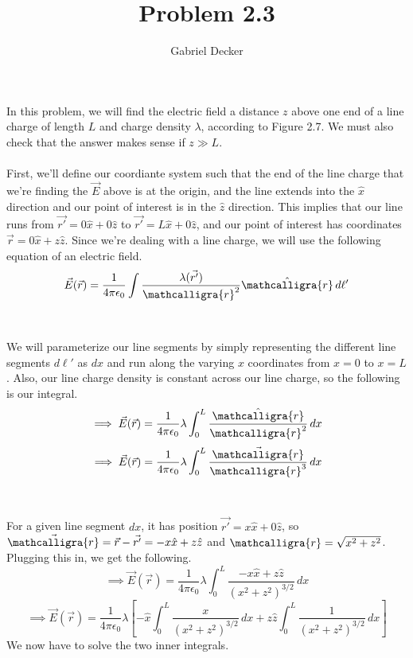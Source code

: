 \documentclass[12pt]{article}
\title{Problem 2.3}
\author{Gabriel Decker}
\newcommand{\scripty}[1]{\ensuremath{\mathcalligra{#1}}}
\begin{document}
\maketitle
\begin{flushleft}

In this problem, we will find the electric field a distance $z$ above one end of a line charge of length $L$ and charge density $\lambda$, according to Figure 2.7.
We must also check that the answer makes sense if $z\gg L$.\\~\\

First, we'll define our coordiante system such that the end of the line charge that we're finding the $\vec{E}$ above is at the origin, and the line extends into the $\hat{x}$ direction and our point of interest is in the $\hat{z}$ direction.
This implies that our line runs from $\vec{r'}=0\hat{x}+0\hat{z}$ to $\vec{r'}=L\hat{x}+0\hat{z}$, and our point of interest has coordinates $\vec{r}=0\hat{x}+z\hat{z}$.
Since we're dealing with a line charge, we will use the following equation of an electric field.
$$\vec{E}(\vec{r})=\frac{1}{4\pi\epsilon_0}\int\frac{\lambda(\vec{r'})}{\scripty{r}^2}\hat{\scripty{r}}\,d\ell'$$\\~\\

We will parameterize our line segments by simply representing the different line segments $d\ell'$ as $dx$ and run along the varying $x$ coordinates from $x=0$ to $x=L$.
Also, our line charge density is constant across our line charge, so the following is our integral.
$$\implies\vec{E}(\vec{r})=\frac{1}{4\pi\epsilon_0}\lambda\int_0^L\frac{\hat{\scripty{r}}}{\scripty{r}^2}\,dx$$
$$\implies\vec{E}(\vec{r})=\frac{1}{4\pi\epsilon_0}\lambda\int_0^L\frac{\vec{\scripty{r}}}{\scripty{r}^3}\,dx$$\\~\\

For a given line segment $dx$, it has position $\vec{r'}=x\hat{x}+0\hat{z}$, so $\vec{\scripty{r}}=\vec{r}-\vec{r'}=-x\hat{x}+z\hat{z}$ and $\scripty{r}=\sqrt{x^2+z^2}$.
Plugging this in, we get the following.
$$\implies\vec{E}(\vec{r})=\frac{1}{4\pi\epsilon_0}\lambda\int_0^L\frac{-x\hat{x}+z\hat{z}}{(x^2+z^2)^{3/2}}\,dx$$
$$\implies\vec{E}(\vec{r})=\frac{1}{4\pi\epsilon_0}\lambda\left[-\hat{x}\int_0^L\frac{x}{(x^2+z^2)^{3/2}}\,dx+z\hat{z}\int_0^L\frac{1}{(x^2+z^2)^{3/2}}\,dx\right]$$
We now have to solve the two inner integrals.\\~\\


\end{flushleft}
\end{document}
